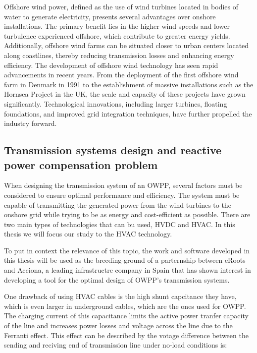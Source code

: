 \documentclass[a4paper,11pt, titlepage, twoside]{article}
\begin{document}
Offshore wind power, defined as the use of wind turbines located in bodies of water to generate electricity, presents several advantages over onshore installations. The primary benefit lies in the higher wind speeds
and lower turbulence experienced offshore, which contribute to greater energy yields. Additionally, offshore wind farms can be situated closer to urban centers located along coastlines, thereby reducing transmission
losses and enhancing energy efficiency. The development of offshore wind technology has seen rapid advancements in recent years. From the deployment of the first offshore wind farm in Denmark in 1991 to the establishment
of massive installations such as the Hornsea Project in the UK, the scale and capacity of these projects have grown significantly. Technological innovations, including larger turbines, floating foundations, and improved
grid integration techniques, have further propelled the industry forward.

\subsection{Transmission systems design and reactive power compensation problem}

When designing the transmission system of an OWPP, several factors must be considered to ensure optimal performance and efficiency. The system must be capable of transmitting the generated power from the wind turbines to the onshore grid
while trying to be as energy and cost-efficient as possible. There are two main types of technologies that can bu used, HVDC and HVAC. In this thesis we will focus our study to the HVAC technology.\par

To put in context the relevance of this topic, the work and software developed in this thesis will be used
as the breeding-ground of a parternship between eRoots and Acciona, a leading infrastructre company in Spain that has shown interest in developing a tool for the optimal design
of OWPP's transmission systems.

One drawback of using HVAC cables is the high shunt capcitance they have, which is even larger in underground cables,
which are the ones used for OWPP. The charging current of this capacitance limits the active power tranfer capacity of the line and increases
power losses and voltage across the line due to the Ferranti effect\cite{ferranti}. This effect can be described by the votage difference between the sending and reciving end of transmission line under no-load conditions is:
\end{document}
